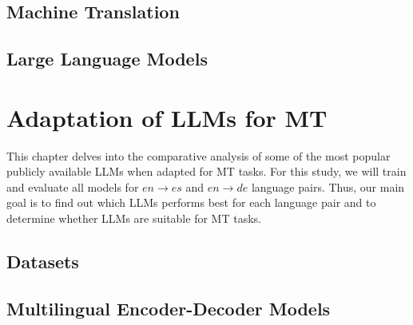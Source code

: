 \documentclass[11pt,english,listoffigures,listoftables]{tfgetsinf}
\begin{document}
\section{Machine Translation}

\section{Large Language Models}




\chapter{Adaptation of LLMs for MT}

This chapter delves into the comparative analysis of some of the most popular publicly available LLMs when adapted for MT tasks. For this study, we will train and evaluate all models for \( en \rightarrow es\) and \( en \rightarrow de\) language pairs. Thus, our main goal is to find out which LLMs performs best for each language pair and to determine whether LLMs are suitable for MT tasks.

\section{Datasets}

\section{Multilingual Encoder-Decoder Models}
\end{document}
